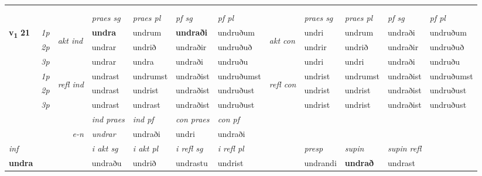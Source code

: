 \begin{longtable}[l]{X>{\footnotesize\itshape}llXXXXlXXXX}
& \\*
& \\
\midrule
 & &   & \textit{praes sg}  & \textit{praes pl}    & \textit{ pf sg} & \textit{pf pl} & & \textit{praes sg}  & \textit{praes pl}    & \textit{pf sg} & \textit{pf pl }  \\ \cmidrule{4-7} \cmidrule{9-12}
 \multirow{2}{*}{{{\textbf{v{\textsubscript{1}}} \Large{\textbf{21}}}}}  & 1p & \multirow{3}{*}{\begin{turn}{90}\textit{akt ind}\end{turn}} & \textbf{undra} & undrum & \textbf{undraði} & undruðum & \multirow{3}{*}{\begin{turn}{90}\textit{akt con}\end{turn}} &undri & undrum & undraði & undruðum\\*
 & 2p &  &  undrar  & undrið & undraðir & undruðuð & & undrir & undrið & undraðir & undruðuð \\*
 & 3p &  & undrar & undra & undraði & undruðu & & undri & undri& undraði & undruðu \\*
\cmidrule{4-7} \cmidrule{9-12}
 & 1p & \multirow{3}{*}{\begin{turn}{90}\textit{refl ind}\end{turn}}  & undrast & undrumst & undraðist & undruðumst & \multirow{3}{*}{\begin{turn}{90}\textit{refl con}\end{turn}}  &undrist & undrumst & undraðist & undruðumst \\*
 & 2p &  & undrast & undrist & undraðist & undruðust & &undrist & undrist & undraðist & undruðust \\*
 & 3p  & & undrast & undrast & undraðist & undruðust & & undrist & undrist& undraðist & undruðust \\*
\cmidrule{4-7} \cmidrule{9-12}

   && &  \textit{ind praes} & \textit{ind pf} & \textit{con praes} & \textit{con pf} \\*
\multicolumn{3}{r}{\textit{e-n}} & undrar & undraði & undri & undraði \\*

\cmidrule{4-7}
   {\textit{inf}} & &  & \textit{i akt sg} & \textit{i akt pl} & \textit{i refl sg} & \textit{i refl pl} && \textit{presp} & \textit{supin} & \textit{supin refl}  \\*
  {\textbf{undra}} & && undraðu  & undrið & undrastu & undrist && undrandi &  \textbf{undrað} & undrast  \\*


\end{longtable}

